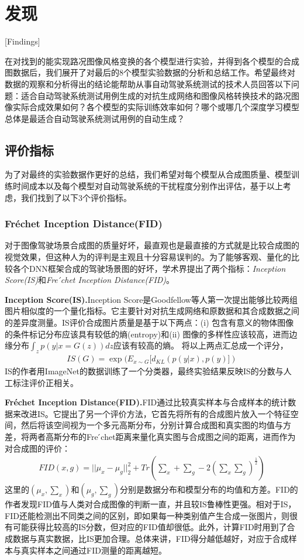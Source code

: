 \chapter{发现}[Findings]

在对找到的能实现路况图像风格变换的各个模型进行实验，并得到各个模型的合成图数据后，我们展开了对最后的8个模型实验数据的分析和总结工作。希望最终对数据的观察和分析得出的结论能帮助从事自动驾驶系统测试的技术人员回答以下问题：适合自动驾驶系统测试用例生成的对抗生成网络和图像风格转换技术的路况图像实际合成效果如何？各个模型的实际训练效率如何？哪个或哪几个深度学习模型总体是最适合自动驾驶系统测试用例的自动生成？

\section{评价指标}

为了对最终的实验数据作更好的总结，我们希望对每个模型从合成图质量、模型训练时间成本以及每个模型对自动驾驶系统的干扰程度分别作出评估，基于以上考虑，我们找到了以下3个评价指标。

\subsection{Fr\'{e}chet Inception Distance(FID)}

对于图像驾驶场景合成图的质量好坏，最直观也是最直接的方式就是比较合成图的视觉效果，但这种人为的评判是主观且十分容易误判的。为了能够客观、量化的比较各个DNN框架合成的驾驶场景图的好坏，学术界提出了两个指标：\textit{Inception Score(IS)}\cite{IS}和\textit{Fre ́chet Inception Distance(FID)}\cite{FID}。

\textbf{Inception Score(IS).\cite{IS}}\quad Inception Score是Goodfellow等人第一次提出能够比较两组图片相似度的一个量化指标。它主要针对对抗生成网络和原数据和其合成数据之间的差异度测量。IS评价合成图片质量是基于以下两点：(i) 包含有意义的物体图像的条件标记分布应该具有较低的熵(entropy)和(ii) 图像的多样性应该较高，进而边缘分布$\int_z p(y|x=G(z))dz$应该有较高的熵。
将以上两点汇总成一个评分，
\begin{gather}
    IS(G)=\exp{(E_{x\sim G}[d_{KL}(p(y|x), p(y)])}
\end{gather}
IS的作者用ImageNet\cite{ImageNet}的数据训练了一个分类器，最终实验结果反映IS的分数与人工标注评价正相关。

\textbf{Fr\'{e}chet Inception Distance(FID).\cite{FID}}\quad FID通过比较真实样本与合成样本的统计数据来改进IS。它提出了另一个评价方法，它首先将所有的合成图片放入一个特征空间，然后将该空间视为一个多元高斯分布，分别计算合成图和真实图的均值与方差，将两者高斯分布的Fre ́chet距离来量化真实图与合成图之间的距离，进而作为对合成图的评价：
\begin{gather}
    FID(x,g)=||\mu_x-\mu_g||_2^2+Tr(\sum_x + \sum_g - 2(\sum_x\sum_g)^{\frac{1}{2}})
\end{gather}
这里的$(\mu_x,\sum_x)$和$(\mu_g,\sum_g)$分别是数据分布和模型分布的均值和方差。FID的作者发现FID值与人类对合成图像的判断一直，并且较IS\cite{IS}鲁棒性更强。相对于IS，FID还能检测出不同类之间的区别，即如果每一种类别值产生合成一张图片，则很有可能获得比较高的IS分数，但对应的FID值却很低。此外，计算FID时用到了合成数据与真实数据，比IS更加合理。总体来讲，FID得分越低越好，对应于合成样本与真实样本之间通过FID测量的距离越短。

